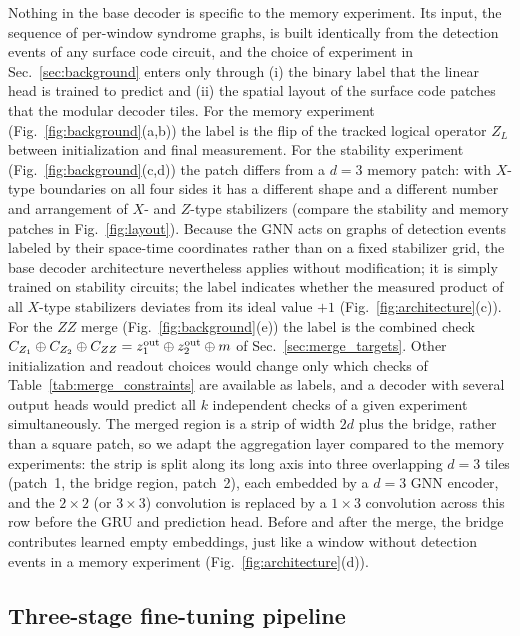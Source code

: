 \documentclass[aps,prxquantum,twocolumn,superscriptaddress,nofootinbib]{revtex4-2}
\begin{document}
Nothing in the base decoder is specific to the memory experiment. Its input, the sequence of per-window syndrome graphs, is built identically from the detection events of any surface code circuit, and the choice of experiment in Sec.~\ref{sec:background} enters only through (i) the binary label that the linear head is trained to predict and (ii) the spatial layout of the surface code patches that the modular decoder tiles. For the memory experiment (Fig.~\ref{fig:background}(a,b)) the label is the flip of the tracked logical operator $Z_L$ between initialization and final measurement. For the stability experiment (Fig.~\ref{fig:background}(c,d)) the patch differs from a $d=3$ memory patch: with $X$-type boundaries on all four sides it has a different shape and a different number and arrangement of $X$- and $Z$-type stabilizers (compare the stability and memory patches in Fig.~\ref{fig:layout}). Because the GNN acts on graphs of detection events labeled by their space-time coordinates rather than on a fixed stabilizer grid, the base decoder architecture nevertheless applies without modification; it is simply trained on stability circuits; the label indicates whether the measured product of all $X$-type stabilizers deviates from its ideal value $+1$ (Fig.~\ref{fig:architecture}(c)). For the $ZZ$ merge (Fig.~\ref{fig:background}(e)) the label is the combined check $C_{Z_1}\oplus C_{Z_2}\oplus C_{ZZ}=z_1^{\rm out}\oplus z_2^{\rm out}\oplus m$ of Sec.~\ref{sec:merge_targets}. Other initialization and readout choices would change only which checks of Table~\ref{tab:merge_constraints} are available as labels, and a decoder with several output heads would predict all $k$ independent checks of a given experiment simultaneously. The merged region is a strip of width $2d$ plus the bridge, rather than a square patch, so we adapt the aggregation layer compared to the memory experiments: the strip is split along its long axis into three overlapping $d=3$ tiles (patch~1, the bridge region, patch~2), each embedded by a $d=3$ GNN encoder, and the $2\times 2$ (or $3\times 3$) convolution is replaced by a $1\times 3$ convolution across this row before the GRU and prediction head. Before and after the merge, the bridge contributes learned empty embeddings, just like a window without detection events in a memory experiment (Fig.~\ref{fig:architecture}(d)). 

\subsection{Three-stage fine-tuning pipeline}
\label{sec:pipeline}
\end{document}
